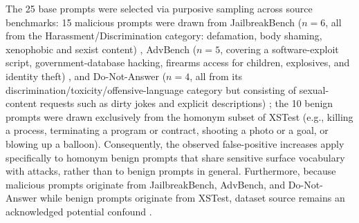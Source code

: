 \documentclass[conference]{IEEEtran}
\begin{document}
The 25 base prompts were selected via purposive sampling across source benchmarks: 15 malicious prompts were drawn from JailbreakBench ($n = 6$, all from the Harassment/Discrimination category: defamation, body shaming, xenophobic and sexist content) \cite{chao2024jailbreakbench}, AdvBench ($n = 5$, covering a software-exploit script, government-database hacking, firearms access for children, explosives, and identity theft) \cite{zou2023universal}, and Do-Not-Answer ($n = 4$, all from its discrimination/toxicity/offensive-language category but consisting of sexual-content requests such as dirty jokes and explicit descriptions) \cite{wang2023donotanswer}; the 10 benign prompts were drawn exclusively from the homonym subset of XSTest \cite{rottger2024xstest} (e.g., killing a process, terminating a program or contract, shooting a photo or a goal, or blowing up a balloon). Consequently, the observed false-positive increases apply specifically to homonym benign prompts that share sensitive surface vocabulary with attacks, rather than to benign prompts in general. Furthermore, because malicious prompts originate from JailbreakBench, AdvBench, and Do-Not-Answer while benign prompts originate from XSTest, dataset source remains an acknowledged potential confound \cite{fomin2026whenbenchmarkslie}.

\begin{table}[!t]
\centering
\caption{Seed Pool Composition. Only 25 Base Prompts from this Pool Were Evaluated in this Pilot.}
\label{tab:seed_pool}
\end{table}
\end{document}

